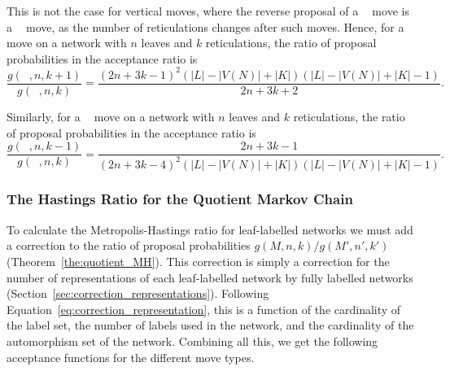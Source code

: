 \documentclass{article}
\theoremstyle{definition}
\DeclareMathOperator{\VM}{Vert^{--}}
\DeclareMathOperator{\VP}{Vert^+}
\begin{document}
This is not the case for vertical moves, where the reverse proposal of a $\VP$ move is a $\VM$ move, as the number of reticulations changes after such moves. Hence, for a $\VP$ move on a network with $n$ leaves and $k$ reticulations, the ratio of proposal probabilities in the acceptance ratio is 
\[ \frac{g(\VM, n,k+1)}{g(\VP, n,k)} = \frac{(2n+3k-1)^2 (|L|-|V(N)|+|K|) (|L|-|V(N)|+|K|-1)}{2n + 3k + 2}.\]

Similarly, for a $\VM$ move on a network with $n$ leaves and $k$ reticulations, the ratio of proposal probabilities in the acceptance ratio is 
\[ \frac{g(\VP, n,k-1)}{g(\VM, n,k)} = \frac{2n + 3k - 1}{(2n+3k-4)^2 (|L|-|V(N)|+|K|) (|L|-|V(N)|+|K|-1)}.\]

\subsubsection{The Hastings Ratio for the Quotient Markov Chain}
To calculate the Metropolis-Hastings ratio for leaf-labelled networks we must add a correction to the ratio of proposal probabilities $g(M,n,k)/g(M',n',k')$ (Theorem~\ref{the:quotient_MH}). This correction is simply a correction for the number of representations of each leaf-labelled network by fully labelled networks (Section~\ref{sec:correction_representations}). Following Equation~\ref{eq:correction_representation}, this is a function of the cardinality of the label set, the number of labels used in the network, and the cardinality of the automorphism set of the network. Combining all this, we get the following acceptance functions for the different move types.
\end{document}
